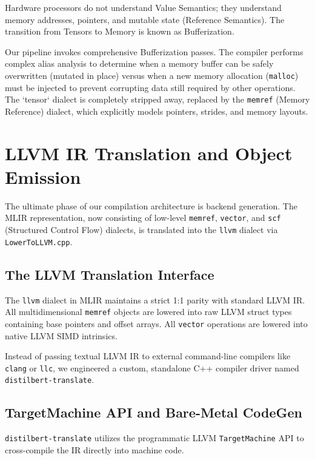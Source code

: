 Hardware processors do not understand Value Semantics; they understand memory addresses, pointers, and mutable state (Reference Semantics). The transition from Tensors to Memory is known as Bufferization. 

Our pipeline invokes comprehensive Bufferization passes. The compiler performs complex alias analysis to determine when a memory buffer can be safely overwritten (mutated in place) versus when a new memory allocation (\texttt{malloc}) must be injected to prevent corrupting data still required by other operations. The `tensor` dialect is completely stripped away, replaced by the \texttt{memref} (Memory Reference) dialect, which explicitly models pointers, strides, and memory layouts.

\section{LLVM IR Translation and Object Emission}
The ultimate phase of our compilation architecture is backend generation. The MLIR representation, now consisting of low-level \texttt{memref}, \texttt{vector}, and \texttt{scf} (Structured Control Flow) dialects, is translated into the \texttt{llvm} dialect via \texttt{LowerToLLVM.cpp}.

\subsection{The LLVM Translation Interface}
The \texttt{llvm} dialect in MLIR maintains a strict 1:1 parity with standard LLVM IR. All multidimensional \texttt{memref} objects are lowered into raw LLVM struct types containing base pointers and offset arrays. All \texttt{vector} operations are lowered into native LLVM SIMD intrinsics.

Instead of passing textual LLVM IR to external command-line compilers like \texttt{clang} or \texttt{llc}, we engineered a custom, standalone C++ compiler driver named \texttt{distilbert-translate}.

\subsection{TargetMachine API and Bare-Metal CodeGen}
\texttt{distilbert-translate} utilizes the programmatic LLVM \texttt{TargetMachine} API to cross-compile the IR directly into machine code. 

